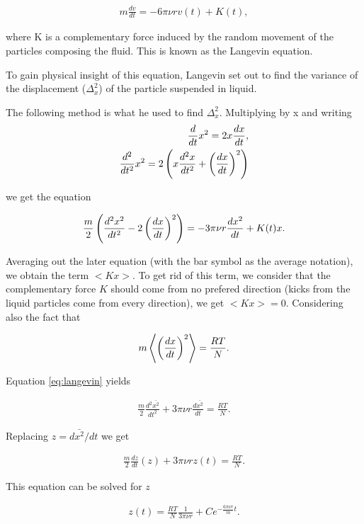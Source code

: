 \begin{align}
\label{eq:langevin}
	m\frac{d v}{dt} = -6\pi\nu r v(t) + K(t),
\end{align}

where K is a complementary force induced by the random movement of the particles composing the fluid. This is known as the Langevin equation. 


To gain physical insight of this equation, Langevin \cite{langevin_original} set out to find the variance of the displacement ($\Delta_x^2$) of the particle suspended in liquid. 

The following method is what he used to find $\Delta_x^2$. Multiplying by x and writing
\begin{align}
	\frac{d}{dt}x^2 = 2x\frac{dx}{dt},\\	
	\frac{d^2}{dt^2}x^2 = 2\left({x\frac{d^2x}{dt^2}+\left({\frac{dx}{dt}}\right)^2}\right)
\end{align}


we get the equation

\begin{align}
	\frac{m}{2}\left({\frac{d^2x^2}{dt^2} - 2\left({\frac{dx}{dt}}\right)^2}\right) = -3\pi\nu r \frac{d x^2}{dt} + K(t)x.
\end{align}

Averaging out the later equation (with the bar symbol as the average notation), we obtain the term $<Kx>$. To get rid of this term, we consider that the complementary force $K$ should come from no prefered direction (kicks from the liquid particles come from every direction), we get $<Kx> = 0$. Considering also the fact that

\begin{align}
	m\left<\left({\frac{d x}{dt}}\right)^2\right> = \frac{RT}{N}.
\end{align}

Equation \ref{eq:langevin} yields

\begin{align}
	\frac{m}{2}\frac{d^2\bar{x^2}}{dt^2} + 3\pi\nu r \frac{d \bar{x^2}}{dt} = \frac{RT}{N}.
\end{align}

Replacing $z = d\bar{x^2}/dt$ we get

\begin{align}
	\frac{m}{2}\frac{dz}{dt}(z) + 3\pi\nu r z(t) = \frac{RT}{N}.
\end{align}

This equation can be solved for $z$

\begin{align}
	\label{eq:sol-to-langevin}
	z(t) = \frac{RT}{N}\frac{1}{3\pi\nu r} + Ce^{-\frac{6\pi\nu r}{m}t}.
\end{align}

